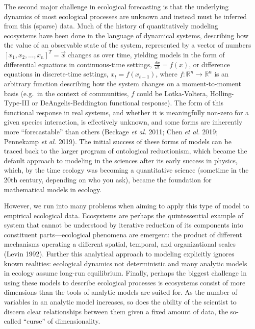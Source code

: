 \documentclass[10pt,oneside]{article}
\begin{document}
The second major challenge in ecological forecasting is that the
underlying dynamics of most ecological processes are unknown and instead
must be inferred from this (sparse) data. Much of the history of
quantitatively modeling ecosystems have been done in the language of
dynamical systems, describing how the value of an observable state of
the system, represented by a vector of numbers
\([x_1, x_2, \dots, x_n]^T = \vec{x}\) changes as over time, yielding
models in the form of differential equations in continuous-time
settings, \(\frac{dx}{dt} = f(x)\), or difference equations in
discrete-time settings, \(x_t = f(x_{t-1})\), where
\(f:\mathbb{R}^n \to \mathbb{R}^n\) is an arbitrary function describing
how the system changes on a moment-to-moment basis (e.g.~in the context
of communities, \(f\) could be Lotka-Voltera, Holling-Type-III or
DeAngelis-Beddington functional response). The form of this functional
response in real systems, and whether it is meaningfully non-zero for a
given species interaction, is effectively unknown, and some forms are
inherently more ``forecastable'' than others (Beckage \emph{et al.}
2011; Chen \emph{et al.} 2019; Pennekamp \emph{et al.} 2019). The
initial success of these forms of models can be traced back to the
larger program of ontological reductionism, which became the default
approach to modeling in the sciences after its early success in physics,
which, by the time ecology was becoming a quantitative science (sometime
in the 20th century, depending on who you ask), became the foundation
for mathematical models in ecology.

However, we run into many problems when aiming to apply this type of
model to empirical ecological data. Ecosystems are perhaps the
quintessential example of system that cannot be understood by iterative
reduction of its components into constituent parts---ecological
phenomena are emergent: the product of different mechanisms operating a
different spatial, temporal, and organizational scales (Levin 1992).
Further this analytical approach to modeling explicitly ignores known
realities: ecological dynamics not deterministic and many analytic
models in ecology assume long-run equilibrium. Finally, perhaps the
biggest challenge in using these models to describe ecological processes
is ecosystems consist of more dimensions than the tools of analytic
models are suited for. As the number of variables in an analytic model
increases, so does the ability of the scientist to discern clear
relationships between them given a fixed amount of data, the so-called
``curse'' of dimensionality.
\end{document}
